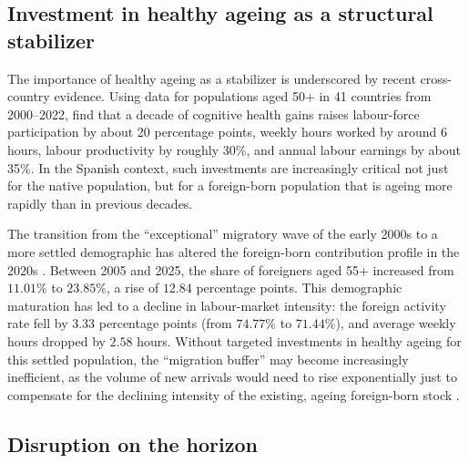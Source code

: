 \subsection{Investment in healthy ageing as a structural stabilizer}

The importance of healthy ageing as a stabilizer is underscored by recent cross-country evidence. Using data for populations aged 50+ in 41 countries from 2000--2022, \textcite{gruss2025healthyAging} find that a decade of cognitive health gains raises labour-force participation by about 20 percentage points, weekly hours worked by around 6 hours, labour productivity by roughly 30\%, and annual labour earnings by about 35\%. In the Spanish context, such investments are increasingly critical not just for the native population, but for a foreign-born population that is ageing more rapidly than in previous decades.

\vspace{0.7em}\par
The transition from the ``exceptional'' migratory wave of the early 2000s \parencite{arango2013exceptional} to a more settled demographic has altered the foreign-born contribution profile in the 2020s \parencite{bde2023ageingParticipation,caixabank2017labourForceAgeing}. Between 2005 and 2025, the share of foreigners aged 55+ increased from \(11.01\%\) to \(23.85\%\), a rise of \(12.84\) percentage points. This demographic maturation has led to a decline in labour-market intensity: the foreign activity rate fell by \(3.33\) percentage points (from \(74.77\%\) to \(71.44\%\)), and average weekly hours dropped by \(2.58\) hours. Without targeted investments in healthy ageing for this settled population, the ``migration buffer'' may become increasingly inefficient, as the volume of new arrivals would need to rise exponentially just to compensate for the declining intensity of the existing, ageing foreign-born stock \parencite{bde2023ageingParticipation, caixabank2017labourForceAgeing}.


\subsection{Disruption on the horizon}

